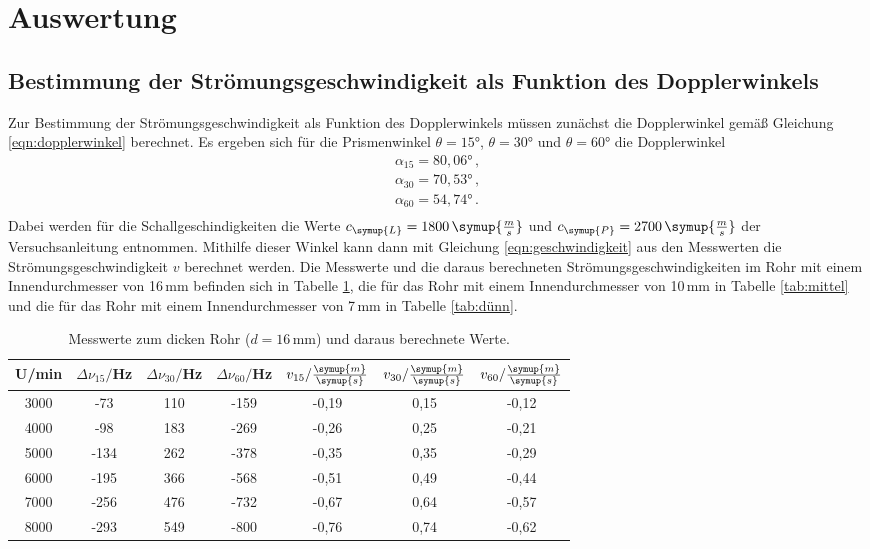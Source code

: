 \section{Auswertung}
\label{sec:Auswertung}

\subsection{Bestimmung der Strömungsgeschwindigkeit als Funktion des Dopplerwinkels}
\label{subsec:geschwindigkeit}

Zur Bestimmung der Strömungsgeschwindigkeit als Funktion des Dopplerwinkels müssen
zunächst die Dopplerwinkel gemäß Gleichung \eqref{eqn:dopplerwinkel} berechnet.
Es ergeben sich für die Prismenwinkel $\theta=15°$, $\theta=30°$ und $\theta=60°$
die Dopplerwinkel
\begin{align*}
  \alpha_{15}=80{,}06° \,,\\
  \alpha_{30}=70{,}53°\,,\\
  \alpha_{60}=54{,}74° \,.\\
\end{align*}
Dabei werden für die Schallgeschindigkeiten die Werte $c_{\symup{L}}=1800\,\symup{\frac{m}{s}}$
und $c_{\symup{P}}=2700\,\symup{\frac{m}{s}}$ der Versuchsanleitung \cite{Versuchsanleitung} entnommen.
Mithilfe dieser Winkel kann dann mit Gleichung \eqref{eqn:geschwindigkeit} aus den
Messwerten die Strömungsgeschwindigkeit $v$ berechnet werden. Die Messwerte und die
daraus berechneten Strömungsgeschwindigkeiten im Rohr mit einem Innendurchmesser von
16\,mm befinden sich in Tabelle \ref{tab:dick}, die für das Rohr mit einem
Innendurchmesser von 10\,mm in Tabelle \ref{tab:mittel} und die für das Rohr
mit einem Innendurchmesser von 7\,mm in Tabelle \ref{tab:dünn}.

\begin{table}[htp]
	\begin{center}
    \caption{Messwerte zum dicken Rohr ($d=16\,$mm) und daraus berechnete Werte.}
    \label{tab:dick}
		\begin{tabular}{ccccccc}
		\toprule
			{U/min} & {$\Delta \nu_{15}/$Hz} & {$\Delta \nu_{30}/$Hz} & {$\Delta \nu_{60}/$Hz} &
      {$v_{15}/\frac{\symup{m}}{\symup{s}}$} & {$v_{30}/\frac{\symup{m}}{\symup{s}}$} &
      {$v_{60}/\frac{\symup{m}}{\symup{s}}$}\\
			\midrule
			3000 & -73 & 110 & -159 & -0,19 & 0,15 & -0,12\\
			4000 & -98 & 183 & -269 & -0,26 & 0,25 & -0,21\\
			5000 & -134 & 262 & -378 & -0,35 & 0,35 & -0,29\\
			6000 & -195 & 366 & -568 & -0,51 & 0,49 & -0,44\\
			7000 & -256 & 476 & -732 & -0,67 & 0,64 & -0,57\\
			8000 & -293 & 549 & -800 & -0,76 & 0,74 & -0,62\\
		\bottomrule
		\end{tabular}
	\end{center}
\end{table}

